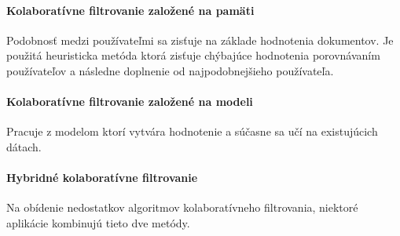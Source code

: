 \paragraph{Kolaboratívne filtrovanie založené na pamäti}

Podobnosť medzi používateľmi sa zisťuje na základe hodnotenia dokumentov. Je použitá heuristicka metóda ktorá zisťuje chýbajúce hodnotenia porovnávaním používateľov a následne doplnenie od najpodobnejšieho používateľa.

\paragraph{Kolaboratívne filtrovanie založené na modeli}

Pracuje z modelom ktorí vytvára hodnotenie a súčasne sa učí na existujúcich dátach.

\paragraph{Hybridné kolaboratívne filtrovanie}

Na obídenie nedostatkov algoritmov kolaboratívneho filtrovania, niektoré aplikácie kombinujú tieto dve metódy.

